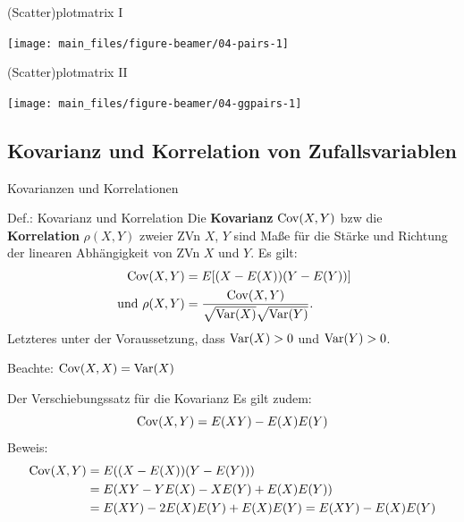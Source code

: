 \documentclass[
  10pt,
  ignorenonframetext,
]{beamer}
\begin{document}
\begin{frame}{(Scatter)plotmatrix I}
\label{scatterplotmatrix-i}
\scriptsize

\begin{center}\texttt{[image: main\_files/figure-beamer/04-pairs-1]} \end{center}

\normalsize
\end{frame}

\begin{frame}{(Scatter)plotmatrix II}
\label{scatterplotmatrix-ii}
\scriptsize

\begin{center}\texttt{[image: main\_files/figure-beamer/04-ggpairs-1]} \end{center}

\normalsize
\end{frame}

\subsection{Kovarianz und Korrelation von
Zufallsvariablen}\label{kovarianz-und-korrelation-von-zufallsvariablen}

\begin{frame}{Kovarianzen und Korrelationen}
\label{kovarianzen-und-korrelationen}
\begin{block}{Def.: Kovarianz und Korrelation}
\label{def.-kovarianz-und-korrelation}
Die \textbf{Kovarianz} \(\operatorname{Cov}(X,Y)\) bzw die \textbf{Korrelation}
\(\rho(X,Y)\) zweier ZVn \(X\), \(Y\) sind Maße für die Stärke und
Richtung der linearen Abhängigkeit von ZVn \(X\) und \(Y\). Es gilt:
\begin{align*}
\operatorname{Cov}(X,Y) &= E[(X - E(X))(Y - E(Y))]\\
\text{ und }\rho(X,Y) &= \frac{\operatorname{Cov}(X,Y)}{\sqrt{\operatorname{Var}(X)} \sqrt{\operatorname{Var}(Y)}}.
\end{align*} Letzteres unter der Voraussetzung, dass \(\operatorname{Var}(X) > 0\) und
\(\operatorname{Var}(Y) > 0\).
\end{block}

Beachte: \(\operatorname{Cov}(X,X) = \operatorname{Var}(X)\)

\end{frame}

\begin{frame}{Der Verschiebungssatz für die Kovarianz}
\label{der-verschiebungssatz-fuxfcr-die-kovarianz}
Es gilt zudem: \[
\operatorname{Cov}(X,Y) = E(XY) - E(X)E(Y)
\] Beweis: \begin{align*}
\operatorname{Cov}(X,Y) &= E((X-E(X))(Y-E(Y))) \\
          &= E(XY - Y E(X) - X E(Y) + E(X)E(Y)) \\
          &= E(XY) - 2E(X)E(Y) +  E(X)E(Y) = E(XY) - E(X)E(Y)
\end{align*}
\end{frame}
\end{document}
